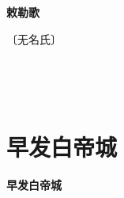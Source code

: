 \documentclass[12pt,UTF-8,openany,fontset=none]{ctexbook}
\begin{document}

\begin{center}
    {\bfseries 敕勒歌}
\end{center}

\begin{center}
    \vspace{10pt}
    
    \begin{large}
        
        〔无名氏〕
        
    \end{large}
    
    \vspace{8pt}
    
    \begin{huge}
        
        \phantom{。}~~

        \phantom{。}
        
        \phantom{。}
        
        \phantom{。}

        \phantom{。}
        
        \phantom{。}~~
        
    \end{huge}
    
\end{center}

\vspace{8pt}
\clearpage


\section{早发白帝城}



\begin{center}
    {\bfseries 早发白帝城}
\end{center}
\end{document}

